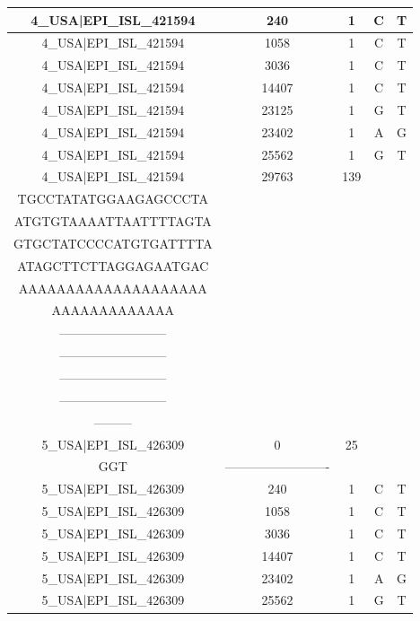 \documentclass[a4paper,10pt]{article}
\begin{document}
\begin{longtable}{@{}ccccc@{}}
4\_USA|EPI\_ISL\_421594 & 240 & 1 & C & T \\* \midrule
4\_USA|EPI\_ISL\_421594 & 1058 & 1 & C & T \\* \midrule
4\_USA|EPI\_ISL\_421594 & 3036 & 1 & C & T \\* \midrule
4\_USA|EPI\_ISL\_421594 & 14407 & 1 & C & T \\* \midrule
4\_USA|EPI\_ISL\_421594 & 23125 & 1 & G & T \\* \midrule
4\_USA|EPI\_ISL\_421594 & 23402 & 1 & A & G \\* \midrule
4\_USA|EPI\_ISL\_421594 & 25562 & 1 & G & T \\* \midrule
4\_USA|EPI\_ISL\_421594 & 29763 & 139 & \begin{tabular}[c]{@{}c@{}}TGAACAATGCTAGGGAGAGC\\ TGCCTATATGGAAGAGCCCTA\\ ATGTGTAAAATTAATTTTAGTA\\ GTGCTATCCCCATGTGATTTTA\\ ATAGCTTCTTAGGAGAATGAC\\ AAAAAAAAAAAAAAAAAAAA\\ AAAAAAAAAAAAA\end{tabular} & \begin{tabular}[c]{@{}c@{}}--------------------------\\ --------------------------\\ --------------------------\\ --------------------------\\ --------------------------\\ ---------\end{tabular} \\* \midrule
5\_USA|EPI\_ISL\_426309 & 0 & 25 & \begin{tabular}[c]{@{}c@{}}ATTAAAGGTTTATACCTTCCCA\\ GGT\end{tabular} & ------------------------- \\* \midrule
5\_USA|EPI\_ISL\_426309 & 240 & 1 & C & T \\* \midrule
5\_USA|EPI\_ISL\_426309 & 1058 & 1 & C & T \\* \midrule
5\_USA|EPI\_ISL\_426309 & 3036 & 1 & C & T \\* \midrule
5\_USA|EPI\_ISL\_426309 & 14407 & 1 & C & T \\* \midrule
5\_USA|EPI\_ISL\_426309 & 23402 & 1 & A & G \\* \midrule
5\_USA|EPI\_ISL\_426309 & 25562 & 1 & G & T \\* \midrule

\end{longtable}
\end{document}
